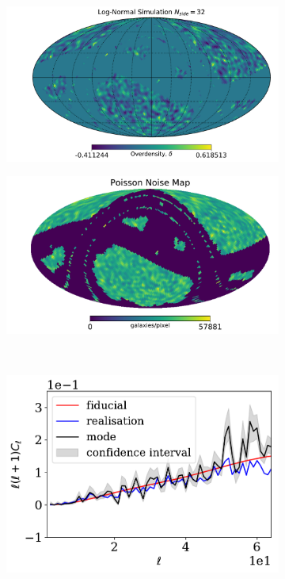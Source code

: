\begin{figure}
\begin{subfigure}[b]{.5\textwidth}
 \includegraphics[scale=0.34]{BPL-FIGS/Euclid-LN-PNoi-N32-HDens_map.pdf}
  \caption{}
  \label{fig:BPL:LN-HighSN-dens}
\end{subfigure}
\begin{subfigure}[b]{.5\textwidth}
 \includegraphics[scale=0.34]{BPL-FIGS/Euclid-LN-PNoi-N32-NoiseMap.pdf}
  \caption{}
  \label{fig:BPL:LN-HighSN-noise}
\end{subfigure}\\
\begin{subfigure}{.5\textwidth}
  \centering
  \includegraphics[scale=0.50]{BPL-FIGS/Euclid-LN-PNoi-N32-HDens_HPDCls.pdf}

\end{subfigure}
\end{figure}
